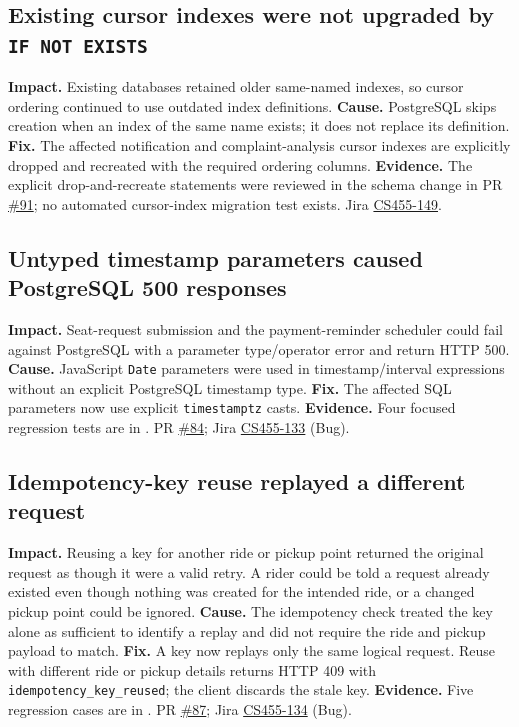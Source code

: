 \documentclass[10pt]{article}
\begin{document}
\subsection{Existing cursor indexes were not upgraded by \texttt{IF NOT EXISTS}}
\textbf{Impact.} Existing databases retained older same-named indexes, so cursor ordering continued to use outdated index definitions.
\textbf{Cause.} PostgreSQL skips creation when an index of the same name exists; it does not replace its definition.
\textbf{Fix.} The affected notification and complaint-analysis cursor indexes are explicitly dropped and recreated with the required ordering columns.
\textbf{Evidence.} The explicit drop-and-recreate statements were reviewed in the schema change in PR \href{https://github.com/CS455-Carpooling/Campus_Ridepooling_Automation/pull/91}{\#91}; no automated cursor-index migration test exists. Jira \href{https://cs455project.atlassian.net/browse/CS455-149}{CS455-149}.
\subsection{Untyped timestamp parameters caused PostgreSQL 500 responses}
\textbf{Impact.} Seat-request submission and the payment-reminder scheduler could fail against PostgreSQL with a parameter type/operator error and return HTTP 500.
\textbf{Cause.} JavaScript \texttt{Date} parameters were used in timestamp/interval expressions without an explicit PostgreSQL timestamp type.
\textbf{Fix.} The affected SQL parameters now use explicit \texttt{timestamptz} casts.
\textbf{Evidence.} Four focused regression tests are in . PR \href{https://github.com/CS455-Carpooling/Campus_Ridepooling_Automation/pull/84}{\#84}; Jira \href{https://cs455project.atlassian.net/browse/CS455-133}{CS455-133} (Bug).
\subsection{Idempotency-key reuse replayed a different request}
\textbf{Impact.} Reusing a key for another ride or pickup point returned the original request as though it were a valid retry. A rider could be told a request already existed even though nothing was created for the intended ride, or a changed pickup point could be ignored.
\textbf{Cause.} The idempotency check treated the key alone as sufficient to identify a replay and did not require the ride and pickup payload to match.
\textbf{Fix.} A key now replays only the same logical request. Reuse with different ride or pickup details returns HTTP 409 with \texttt{idempotency\_key\_reused}; the client discards the stale key.
\textbf{Evidence.} Five regression cases are in . PR \href{https://github.com/CS455-Carpooling/Campus_Ridepooling_Automation/pull/87}{\#87}; Jira \href{https://cs455project.atlassian.net/browse/CS455-134}{CS455-134} (Bug).
\end{document}
